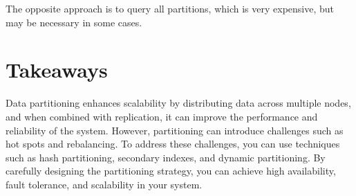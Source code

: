 The opposite approach is to query all partitions, which is very expensive, but may be necessary in some cases.


\section{Takeaways}
Data partitioning enhances scalability by distributing data across multiple nodes, and when combined with replication, it can improve the performance and reliability of the system. However, partitioning can introduce challenges such as hot spots and rebalancing. To address these challenges, you can use techniques such as hash partitioning, secondary indexes, and dynamic partitioning. By carefully designing the partitioning strategy, you can achieve high availability, fault tolerance, and scalability in your system.